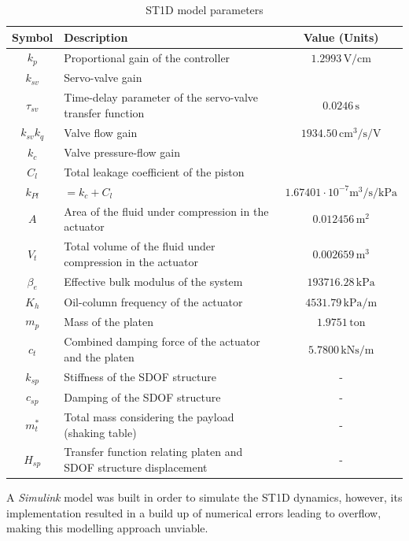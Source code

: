 \documentclass[9pt]{extarticle}
\begin{document}
\begin{table}[H]
\centering
\caption{ST1D model parameters \citep{tekeste2021}}
\begin{tabular}{|c|l|c|}
\hline
\textbf{Symbol} & \textbf{Description} & \textbf{Value (Units)} \\ \hline
$k_p$ & Proportional gain of the controller & $1.2993 \, \text{V/cm}$ \\ \hline
$k_{sv}$ & Servo-valve gain &  \\ \hline %
$\tau_{sv}$ & Time-delay parameter of the servo-valve transfer function & $0.0246 \, \text{s}$ \\ \hline
$k_{sv}k_q$ & Valve flow gain & $1934.50 \, \text{cm}^3/\text{s/V}$ \\ \hline %
$k_c$ & Valve pressure-flow gain &   \\ \hline %
$C_l$ & Total leakage coefficient of the piston &  \\ \hline %
$ k_{Pl}$ & $ = k_c + C_l $ & $ 1.67401\cdot 10^{-7}   \text{m}^3/\text{s/kPa} $\\ \hline
$A$ & Area of the fluid under compression in the actuator & $0.012456 \, \text{m}^2$ \\ \hline
$V_t$ & Total volume of the fluid under compression in the actuator & $0.002659 \, \text{m}^3$ \\ \hline
$\beta_e$ & Effective bulk modulus of the system & $193716.28 \, \text{kPa}$ \\ \hline
$K_h$ & Oil-column frequency of the actuator & $4531.79 \, \text{kPa/m}$ \\ \hline
$m_p$ & Mass of the platen & $1.9751 \, \text{ton}$ \\ \hline
$c_t$ & Combined damping force of the actuator and the platen & $5.7800 \, \text{kNs/m}$ \\ \hline
$k_{sp}$ & Stiffness of the SDOF structure & - \\ \hline
$c_{sp}$ & Damping of the SDOF structure & - \\ \hline
$m_t^*$ & Total mass considering the payload (shaking table) & - \\ \hline
$H_{sp}$ & Transfer function relating platen and SDOF structure displacement & - \\ \hline
\end{tabular}
\label{tab:parameters}
\end{table}


A \textit{Simulink} model %
was built in order to simulate the ST1D dynamics, however, its implementation resulted in a build up of numerical errors leading to overflow, making this modelling approach unviable.
\end{document}
